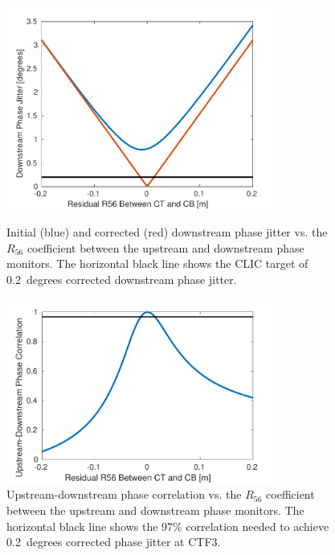 \begin{figure}
  \centering
  \includegraphics[width=0.8\textwidth]{Figures/propagation/jitVsR56}
  \caption{Initial (blue) and corrected (red) downstream phase jitter vs. the \(R_{56}\) coefficient between the upstream and downstream phase monitors. The horizontal black line shows the CLIC target of 0.2~degrees corrected downstream phase jitter.}
  \label{f:jitVsR56}
  \includegraphics[width=0.8\textwidth]{Figures/propagation/corrVsR56}
  \caption{Upstream-downstream phase correlation vs. the \(R_{56}\) coefficient between the upstream and downstream phase monitors. The horizontal black line shows the 97\% correlation needed to achieve 0.2~degrees corrected phase jitter at CTF3.}
  \label{f:corrVsR56}
\end{figure}

